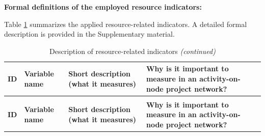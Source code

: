 \documentclass[preprint,
3p]{elsarticle} %
\begin{document}
\begin{appendices}
\textbf{Formal definitions of the employed resource indicators:}

Table \ref{tab:DESCRESRELIND} summarizes the applied resource-related
indicators. A detailed formal description is provided in the
Supplementary material.

\begingroup\fontsize{8}{10}\selectfont

\begin{longtable}[t]{l>{\raggedright\arraybackslash}p{2.2cm}>{\raggedright\arraybackslash}p{4.1cm}>{\raggedright\arraybackslash}p{3.5cm}}
\caption{\label{tab:DESCRESRELIND}Description of resource-related indicators}\\
\toprule
\textbf{ID} & \textbf{Variable name} & \textbf{Short description (what it measures)} & \textbf{Why is it important to measure in an activity-on-node project network?}\\
\midrule
\endfirsthead
\caption[]{Description of resource-related indicators \textit{(continued)}}\\
\toprule
\textbf{ID} & \textbf{Variable name} & \textbf{Short description (what it measures)} & \textbf{Why is it important to measure in an activity-on-node project network?}\\
\midrule
\endhead


\end{longtable}
\end{appendices}
\end{document}
